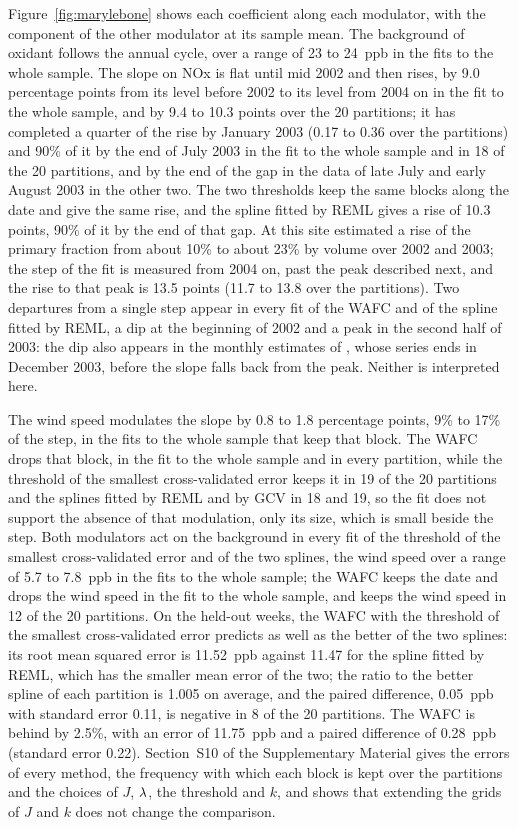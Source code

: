 Figure~\ref{fig:marylebone} shows each coefficient along each modulator, with
the component of the other modulator at its sample mean. The background of
oxidant follows the annual cycle, over a range of 23 to 24~ppb in the fits to
the whole sample. The slope on NOx is flat until mid 2002 and then rises, by
9.0 percentage points from its level before 2002 to its level from 2004 on in
the fit to the whole sample, and by 9.4 to 10.3 points over the 20
partitions; it has completed a quarter of the rise by January 2003 (0.17 to
0.36 over the partitions) and 90\% of it by the end of July 2003 in the fit
to the whole sample and in 18 of the 20 partitions, and by the end of the gap
in the data of late July and early August 2003 in the other two. The two
thresholds keep the same blocks along the date and give the same rise, and
the spline fitted by REML gives a rise of 10.3 points, 90\% of it by the end
of that gap. At
this site \citet[Figure~3(a)]{Carslaw-2005} estimated a rise of the primary
fraction from about 10\% to about 23\% by volume over 2002 and 2003; the step
of the fit is measured from 2004 on, past the peak described next, and the
rise to that peak is 13.5 points (11.7 to 13.8 over the partitions). Two
departures from a single step appear in every fit of the WAFC and of the
spline fitted by REML, a dip at the beginning of 2002 and a peak in the
second half of 2003: the dip also appears in the monthly estimates of
\citet[Figure~3(a)]{Carslaw-2005}, whose series ends in December 2003,
before the slope falls back from the peak. Neither is interpreted here.

The wind speed modulates the slope by 0.8 to 1.8 percentage points, 9\% to
17\% of the step, in the fits to the whole sample that keep that block. The
WAFC drops that block, in the fit to the whole sample and in every partition,
while the threshold of the smallest cross-validated error keeps it in 19 of
the 20 partitions and the splines fitted by REML and by GCV in 18 and 19, so
the fit does not support the absence of that modulation, only its size,
which is small beside the step. Both modulators act on the background in
every fit of the threshold of the smallest cross-validated error and of the
two splines, the wind speed over a range of 5.7 to 7.8~ppb in the fits to
the whole sample; the WAFC keeps the date and drops the wind speed in the
fit to the whole sample, and keeps the wind speed in 12 of the 20
partitions. On the held-out weeks, the WAFC with the threshold of the
smallest cross-validated error predicts as well as the better of the two
splines: its root mean squared error is 11.52~ppb against 11.47 for the
spline fitted by REML, which has the smaller mean error of the two; the
ratio to the better spline of each partition is 1.005 on average, and the
paired difference, 0.05~ppb with standard error 0.11, is negative in 8 of
the 20 partitions. The WAFC is behind by 2.5\%, with an error of 11.75~ppb
and a paired difference of 0.28~ppb (standard error 0.22). Section~S10 of the
Supplementary Material gives the errors of every method, the frequency with
which each block is kept over the partitions and the choices of $J$, $\lambda$,
the threshold and $k$, and shows that extending the grids of $J$ and $k$ does
not change the comparison.

